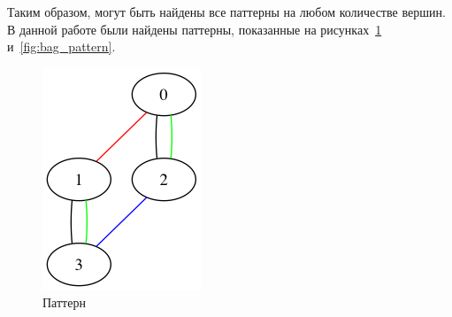 Таким образом, могут быть найдены все паттерны на любом количестве вершин.
В данной работе были найдены паттерны, показанные на рисунках~\ref{fig:cylinder_pattern} и~\ref{fig:bag_pattern}.
\begin{figure}[H]
  \centering
  \includegraphics[max width=\linewidth]{fig/2/patterns/cylinder.png}
    \caption{Паттерн }
    \label{fig:cylinder_pattern}
  \endminipage

\end{figure}
